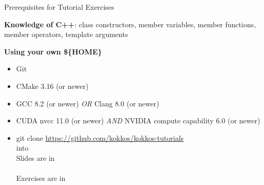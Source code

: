 




\begin{frame}{Prerequisites for Tutorial Exercises}

\textbf{Knowledge of C++}:
  class constructors, member variables, member functions, member operators, template arguments

\vspace{10pt}


\vspace{10pt}

\textbf{Using your own {\$\{HOME\}}}
\begin{scriptsize}
  \begin{itemize}
  \item {Git}
  \item {CMake 3.16 (or newer)}
  \item {GCC 8.2 (or newer)}
    \textit{OR} {Clang 8.0 (or newer)}
  \item {CUDA nvcc 11.0 (or newer)}
    \textit{AND} {NVIDIA compute capability 6.0 (or newer)}
  \item {git clone \url{https://github.com/kokkos/kokkos-tutorials} \\ \hspace{2pt}  into }
        \\ \vspace{4pt} \hspace{2pt} Slides are in \\ \hspace{8pt} 
        \\ \vspace{4pt} \hspace{2pt} Exercises are in \\ \hspace{8pt} 
  \end{itemize}
\end{scriptsize}

\end{frame}


